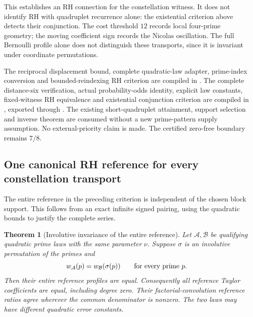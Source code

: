 \documentclass[11pt]{article}
\newtheorem{theorem}{Theorem}[section]
\theoremstyle{definition}
\begin{document}
This establishes an RH connection for the constellation witness.
It does not identify RH with quadruplet recurrence alone: the
existential criterion above detects their conjunction. The cost
threshold $12$ records local four-prime geometry; the moving
coefficient sign records the Nicolas oscillation. The full
Bernoulli profile alone does not distinguish these transports,
since it is invariant under coordinate permutations.

\begin{flushleft}
The reciprocal displacement bound, complete quadratic-law adapter,
prime-index conversion and bounded-reindexing RH criterion are
compiled in
.
The complete distance-six verification, actual probability-odds
identity, explicit law constants, fixed-witness RH equivalence and
existential conjunction criterion are compiled in
, exported through
.
The existing short-quadruplet attainment, support selection and
inverse theorem are consumed without a new prime-pattern supply
assumption. No external-priority claim is made. The certified
zero-free boundary remains $7/8$.
\end{flushleft}


\clearpage
\subsection{One canonical RH reference for every constellation transport}

The entire reference in the preceding criterion is independent of the
chosen block support. This follows from an exact infinite signed pairing,
using the quadratic bounds to justify the complete series.

\begin{theorem}[Involutive invariance of the entire reference]
Let $\mathcal A,\mathcal B$ be qualifying quadratic prime laws with
the same parameter $\nu$. Suppose $\sigma$ is an involutive permutation
of the primes and
\[
 w_{\mathcal A}(p)=w_{\mathcal B}(\sigma(p))
       \qquad\hbox{for every prime }p.
\]
Then their entire reference profiles are equal. Consequently all
reference Taylor coefficients are equal, including degree zero.
Their factorial-convolution reference ratios agree wherever the common
denominator is nonzero.
The two laws may have different quadratic error constants.
\end{theorem}
\end{document}
